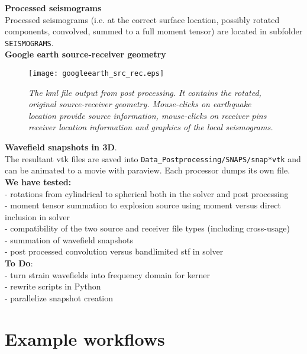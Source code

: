 \documentclass[11pt,letter,fleqn,english,notitlepage]{article}
\begin{document}
\noindent \textbf{Processed seismograms}\\
Processed seismograms (i.e. at the correct surface location, possibly rotated components, convolved, summed to a full 
moment tensor) are located in subfolder {\tt SEISMOGRAMS}.\\

\noindent \textbf{Google earth source-receiver geometry}\\
\begin{figure*}[htb]
\begin{center}
\texttt{[image: googleearth\_src\_rec.eps]}
\caption{\textit{The kml file output from post processing. It contains the rotated, original source-receiver geometry. Mouse-clicks 
on earthquake location provide source information, mouse-clicks on receiver pins receiver location information and graphics 
of the local seismograms.}}
\end{center}
\end{figure*}

\noindent \textbf{Wavefield snapshots in 3D}.\\
The resultant vtk files are saved into {\tt Data\_Postprocessing/SNAPS/snap*vtk} and can be animated to a movie 
with paraview. Each processor dumps its own file.\\

\noindent \textbf{We have tested:}\\
- rotations from cylindrical to spherical both in the solver and post processing\\
- moment tensor summation to explosion source using moment versus direct inclusion in solver\\
-  compatibility of the two source and receiver file types (including cross-usage)\\
- summation of wavefield snapshots\\
- post processed convolution versus bandlimited stf in solver\\

\noindent \textbf{To Do}:\\
- turn strain wavefields into frequency domain for kerner\\
- rewrite scripts in Python\\
- parallelize snapshot creation

\section{Example workflows}
\end{document}

